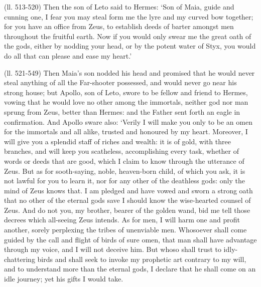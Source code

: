 (ll. 513-520) Then the son of Leto said to Hermes: ‘Son of Maia, guide
and cunning one, I fear you may steal form me the lyre and my curved bow
together; for you have an office from Zeus, to establish deeds of barter
amongst men throughout the fruitful earth. Now if you would only swear me the
great oath of the gods, either by nodding your head, or by the potent water of
Styx, you would do all that can please and ease my heart.’

(ll. 521-549) Then Maia’s son nodded his head and promised that he would
never steal anything of all the Far-shooter possessed, and would never go near
his strong house; but Apollo, son of Leto, swore to be fellow and friend to
Hermes, vowing that he would love no other among the immortals, neither god nor
man sprung from Zeus, better than Hermes: and the Father sent forth an eagle in
confirmation. And Apollo sware also: ‘Verily I will make you only to be
an omen for the immortals and all alike, trusted and honoured by my heart.
Moreover, I will give you a splendid staff of riches and wealth: it is of gold,
with three branches, and will keep you scatheless, accomplishing every task,
whether of words or deeds that are good, which I claim to know through the
utterance of Zeus. But as for sooth-saying, noble, heaven-born child, of which
you ask, it is not lawful for you to learn it, nor for any other of the
deathless gods: only the mind of Zeus knows that. I am pledged and have vowed
and sworn a strong oath that no other of the eternal gods save I should know
the wise-hearted counsel of Zeus. And do not you, my brother, bearer of the
golden wand, bid me tell those decrees which all-seeing Zeus intends. As for
men, I will harm one and profit another, sorely perplexing the tribes of
unenviable men. Whosoever shall come guided by the call and flight of birds of
sure omen, that man shall have advantage through my voice, and I will not
deceive him. But whoso shall trust to idly-chattering birds and shall seek to
invoke my prophetic art contrary to my will, and to understand more than the
eternal gods, I declare that he shall come on an idle journey; yet his gifts I
would take.

